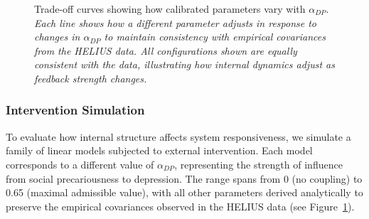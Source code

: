 \documentclass[
]{article}
\begin{document}
\begin{figure}


\caption{\label{fig-tradeoff}Trade-off curves showing how calibrated
parameters vary with \(\alpha_{DP}\). \emph{Each line shows how a
different parameter adjusts in response to changes in \(\alpha_{DP}\) to
maintain consistency with empirical covariances from the HELIUS data.
All configurations shown are equally consistent with the data,
illustrating how internal dynamics adjust as feedback strength
changes.}}

\end{figure}%

\subsubsection{Intervention Simulation}\label{intervention-simulation}

To evaluate how internal structure affects system responsiveness, we
simulate a family of linear models subjected to external intervention.
Each model corresponds to a different value of \(\alpha_{DP}\),
representing the strength of influence from social precariousness to
depression. The range spans from 0 (no coupling) to 0.65 (maximal
admissible value), with all other parameters derived analytically to
preserve the empirical covariances observed in the HELIUS data (see
Figure~\ref{fig-tradeoff}).
\end{document}
